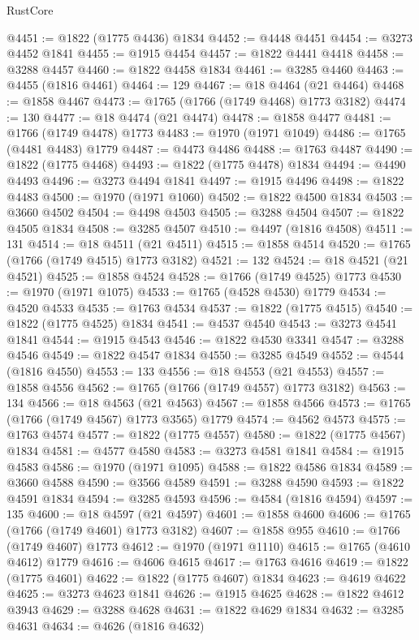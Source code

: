 \begin{lexlean}{RustCore}
\begin{coremodule}
@4451 := @1822 (@1775 @4436) @1834
@4452 := @4448 @4451
@4454 := @3273 @4452 @1841
@4455 := @1915 @4454
@4457 := @1822 @4441 @4418
@4458 := @3288 @4457
@4460 := @1822 @4458 @1834
@4461 := @3285 @4460
@4463 := @4455 (@1816 @4461)
@4464 := 129
@4467 := @18 @4464 (@21 @4464)
@4468 := @1858 @4467
@4473 := @1765 (@1766 (@1749 @4468) @1773 @3182)
@4474 := 130
@4477 := @18 @4474 (@21 @4474)
@4478 := @1858 @4477
@4481 := @1766 (@1749 @4478) @1773
@4483 := @1970 (@1971 @1049)
@4486 := @1765 (@4481 @4483) @1779
@4487 := @4473 @4486
@4488 := @1763 @4487
@4490 := @1822 (@1775 @4468)
@4493 := @1822 (@1775 @4478) @1834
@4494 := @4490 @4493
@4496 := @3273 @4494 @1841
@4497 := @1915 @4496
@4498 := @1822 @4483
@4500 := @1970 (@1971 @1060)
@4502 := @1822 @4500 @1834
@4503 := @3660 @4502
@4504 := @4498 @4503
@4505 := @3288 @4504
@4507 := @1822 @4505 @1834
@4508 := @3285 @4507
@4510 := @4497 (@1816 @4508)
@4511 := 131
@4514 := @18 @4511 (@21 @4511)
@4515 := @1858 @4514
@4520 := @1765 (@1766 (@1749 @4515) @1773 @3182)
@4521 := 132
@4524 := @18 @4521 (@21 @4521)
@4525 := @1858 @4524
@4528 := @1766 (@1749 @4525) @1773
@4530 := @1970 (@1971 @1075)
@4533 := @1765 (@4528 @4530) @1779
@4534 := @4520 @4533
@4535 := @1763 @4534
@4537 := @1822 (@1775 @4515)
@4540 := @1822 (@1775 @4525) @1834
@4541 := @4537 @4540
@4543 := @3273 @4541 @1841
@4544 := @1915 @4543
@4546 := @1822 @4530 @3341
@4547 := @3288 @4546
@4549 := @1822 @4547 @1834
@4550 := @3285 @4549
@4552 := @4544 (@1816 @4550)
@4553 := 133
@4556 := @18 @4553 (@21 @4553)
@4557 := @1858 @4556
@4562 := @1765 (@1766 (@1749 @4557) @1773 @3182)
@4563 := 134
@4566 := @18 @4563 (@21 @4563)
@4567 := @1858 @4566
@4573 := @1765 (@1766 (@1749 @4567) @1773 @3565) @1779
@4574 := @4562 @4573
@4575 := @1763 @4574
@4577 := @1822 (@1775 @4557)
@4580 := @1822 (@1775 @4567) @1834
@4581 := @4577 @4580
@4583 := @3273 @4581 @1841
@4584 := @1915 @4583
@4586 := @1970 (@1971 @1095)
@4588 := @1822 @4586 @1834
@4589 := @3660 @4588
@4590 := @3566 @4589
@4591 := @3288 @4590
@4593 := @1822 @4591 @1834
@4594 := @3285 @4593
@4596 := @4584 (@1816 @4594)
@4597 := 135
@4600 := @18 @4597 (@21 @4597)
@4601 := @1858 @4600
@4606 := @1765 (@1766 (@1749 @4601) @1773 @3182)
@4607 := @1858 @955
@4610 := @1766 (@1749 @4607) @1773
@4612 := @1970 (@1971 @1110)
@4615 := @1765 (@4610 @4612) @1779
@4616 := @4606 @4615
@4617 := @1763 @4616
@4619 := @1822 (@1775 @4601)
@4622 := @1822 (@1775 @4607) @1834
@4623 := @4619 @4622
@4625 := @3273 @4623 @1841
@4626 := @1915 @4625
@4628 := @1822 @4612 @3943
@4629 := @3288 @4628
@4631 := @1822 @4629 @1834
@4632 := @3285 @4631
@4634 := @4626 (@1816 @4632)

\end{coremodule}
\end{lexlean}
